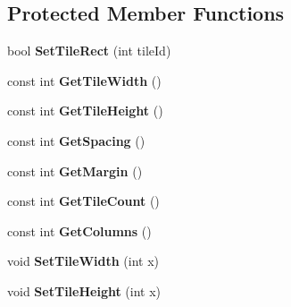 \subsection*{Protected Member Functions}
\begin{DoxyCompactItemize}
\item 
\mbox{\label{classTileSetSurfaceModule_a2ea9aee4767ecd1c57f9defa0b00b462}} 
bool {\bfseries Set\+Tile\+Rect} (int tile\+Id)
\item 
\mbox{\label{classTileSetSurfaceModule_a70b7de5311e1f5514489501ddd1d6474}} 
const int {\bfseries Get\+Tile\+Width} ()
\item 
\mbox{\label{classTileSetSurfaceModule_ad94f89cc7fcbb74fae29b16f882ac1a8}} 
const int {\bfseries Get\+Tile\+Height} ()
\item 
\mbox{\label{classTileSetSurfaceModule_a3ba2c93c0ea045230797952a84fcb36d}} 
const int {\bfseries Get\+Spacing} ()
\item 
\mbox{\label{classTileSetSurfaceModule_a66990ecffa35de4ef4b7f40795e2fbc7}} 
const int {\bfseries Get\+Margin} ()
\item 
\mbox{\label{classTileSetSurfaceModule_a131321a5570594f097ac7d25b7b4a00d}} 
const int {\bfseries Get\+Tile\+Count} ()
\item 
\mbox{\label{classTileSetSurfaceModule_a5351fbcd02c9970a23e54f9986f85e72}} 
const int {\bfseries Get\+Columns} ()
\item 
\mbox{\label{classTileSetSurfaceModule_a2aeec48f98e335532248c4449f4e2a46}} 
void {\bfseries Set\+Tile\+Width} (int x)
\item 
\mbox{\label{classTileSetSurfaceModule_a35d1ddd5b8d92ce7773a771ce00a68a3}} 
void {\bfseries Set\+Tile\+Height} (int x)
\item 
\mbox{\label{classTileSetSurfaceModule_a33265b5e18cb03ef30448b6b851c35f8}} 

\end{DoxyCompactItemize}
